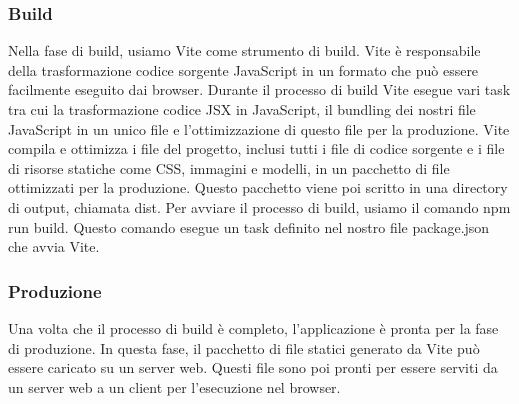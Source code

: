 \subsubsection{Build}
Nella fase di build, usiamo Vite come strumento di build. 
Vite è responsabile della trasformazione codice sorgente JavaScript in un formato che può essere facilmente eseguito dai browser. 
Durante il processo di build Vite esegue vari task tra cui la trasformazione codice JSX in JavaScript,
il bundling dei nostri file JavaScript in un unico file e l'ottimizzazione di questo file per la produzione.
Vite compila e ottimizza i file del progetto, inclusi tutti i file di codice sorgente e i file di risorse statiche come CSS, immagini e modelli, 
in un pacchetto di file ottimizzati per la produzione. 
Questo pacchetto viene poi scritto in una directory di output, chiamata dist.
Per avviare il processo di build, usiamo il comando npm run build. Questo comando esegue un task definito nel nostro file package.json che avvia 
Vite.
\subsubsection{Produzione}
Una volta che il processo di build è completo, l'applicazione è pronta per la fase di produzione. 
In questa fase, il pacchetto di file statici generato da Vite può essere caricato su un server web. 
Questi file sono poi pronti per essere serviti da un server web a un client per l'esecuzione nel browser.